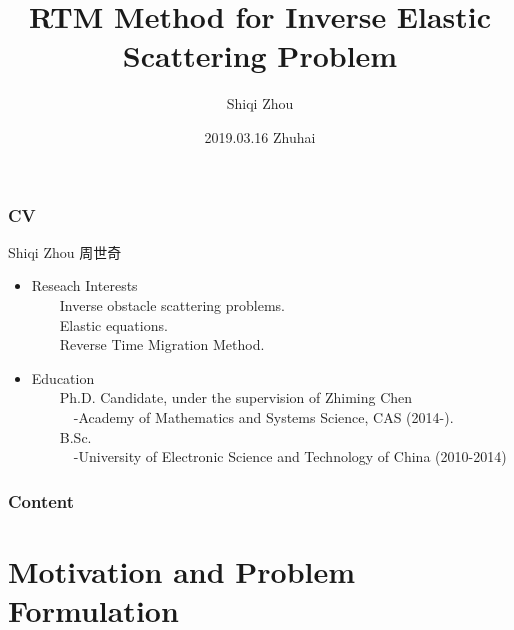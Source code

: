 \documentclass[utf-8,8pt]{beamer}
\begin{document}
\title[]{RTM Method for Inverse Elastic Scattering Problem}

\author[]{Shiqi Zhou}
\date[]{2019.03.16 Zhuhai}



\begin{frame}
\frametitle{CV}
\begin{flushleft}
	\LARGE \textcolor[rgb]{0.00,0.00,1.00}{Shiqi Zhou 周世奇}
\end{flushleft}
\begin{itemize}
	\item Reseach Interests  \\
	\ \ \ \   Inverse obstacle scattering problems. \\
	\ \ \ \   Elastic equations.\\
	\ \ \ \   Reverse Time Migration Method.
\end{itemize}
\begin{itemize}
	\item Education \\
	\ \ \ \   Ph.D. Candidate, under the supervision of Zhiming Chen\\
	\ \ \ \ \ \ -Academy of Mathematics and Systems Science, CAS (2014-).\\
	\ \ \ \  B.Sc. \\
	\ \ \ \ \ \ -University of Electronic Science and Technology of China (2010-2014)
\end{itemize}
\end{frame}



\begin{frame}
  \titlepage
\end{frame}

\begin{frame}
  \frametitle{Content}
  \setcounter{tocdepth}{1}
  \tableofcontents%
\end{frame}


\section{Motivation and Problem Formulation}
\end{document}
